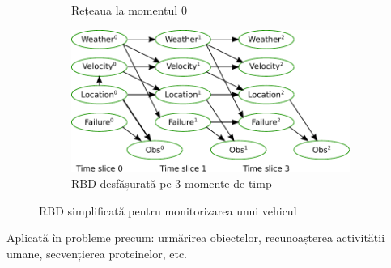 \begin{frame}[t]
\begin{figure}
\begin{subfigure}[b]{0.30\textwidth}
  			\caption{\tiny{Rețeaua la momentul 0}}
  			\label{fig:zeroDBN}
  		\end{subfigure}
  		\begin{subfigure}[b]{0.35\textwidth}
			\centering
			\includegraphics[width=\textwidth]{graphics/hmm-intro/dbn-vehicle/unrolled.pdf} 
  			\caption{\tiny{RBD desfășurată pe 3 momente de timp}}
  			\label{fig:unrolledDBN}
  		\end{subfigure}
  		\caption{\tiny{RBD simplificată pentru monitorizarea unui vehicul \citep{KollerFriedman09}}}
  		\label{fig:DBN}
  	\end{figure}
  	
  	\small{Aplicată în probleme precum: urmărirea obiectelor, recunoașterea activității umane, secvențierea proteinelor, etc.}
\end{frame}


